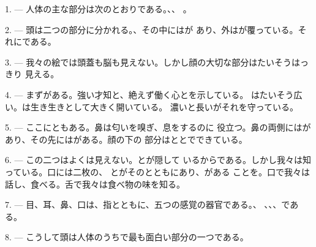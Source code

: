 %

\VUsaut{4.0mm}
\VUsaut{2.0mm}

\VUsaut{2.4mm}
\VUsaut{3.0mm}

1. --- 人体の主な部分は次のとおりである。、、
。

\VUsaut{3.0mm}

2. --- 頭は二つの部分に分かれる。、その中にはが
あり、外はが覆っている。それにである。

3. --- 我々の絵では頭蓋も脳も見えない。しかし顔の大切な部分はたいそうはっきり
見える。

4. --- まずがある。強い才知と、絶えず働く心とを示している。
はたいそう広い。は生き生きとして大きく開いている。
濃いと長いがそれを守っている。

5. --- ここにともある。鼻は匂いを嗅ぎ、息をするのに
役立つ。鼻の両側にはがあり、その先にはがある。顔の下の
部分はととでできている。

6. --- この二つはよくは見えない。とが隠して
いるからである。しかし我々は知っている。口には二枚の、
とがそのとともにあり、がある
ことを。口で我々は話し、食べる。舌で我々は食べ物の味を知る。

7. --- 目、耳、鼻、口は、指とともに、五つの感覚の器官である。、
、、、である。

8. --- こうして頭は人体のうちで最も面白い部分の一つである。

\VUsaut{4.4mm}
\VUsaut{3.0mm}

